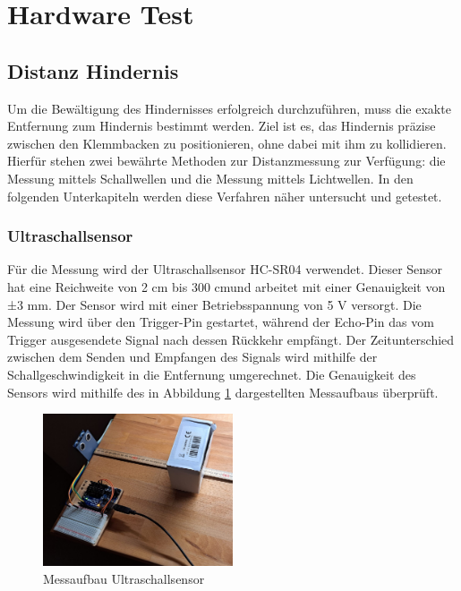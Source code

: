 \documentclass[../main.tex]{subfiles}
\begin{document}
\newpage
\section{Hardware Test}
\label{sec:Hardware_Test}
\subsection{Distanz Hindernis}
Um die Bewältigung des Hindernisses erfolgreich durchzuführen, muss die exakte Entfernung zum Hindernis bestimmt werden. Ziel ist es, das Hindernis präzise zwischen den Klemmbacken zu positionieren, ohne dabei mit ihm zu kollidieren. Hierfür stehen zwei bewährte Methoden zur Distanzmessung zur Verfügung: die Messung mittels Schallwellen und die Messung mittels Lichtwellen. In den folgenden Unterkapiteln werden diese Verfahren näher untersucht und getestet.

\subsubsection{Ultraschallsensor}
Für die Messung wird der Ultraschallsensor HC-SR04 verwendet. Dieser Sensor hat eine Reichweite von 2 cm bis 300 cm\footnotemark und arbeitet mit einer Genauigkeit von ±3 mm. Der Sensor wird mit einer Betriebsspannung von 5 V versorgt. Die Messung wird über den Trigger-Pin gestartet, während der Echo-Pin das vom Trigger ausgesendete Signal nach dessen Rückkehr empfängt. Der Zeitunterschied zwischen dem Senden und Empfangen des Signals wird mithilfe der Schallgeschwindigkeit in die Entfernung umgerechnet. Die Genauigkeit des Sensors wird mithilfe des in Abbildung \ref{fig:Ultraschall1} dargestellten Messaufbaus überprüft.

\begin{figure}[h] %
    \centering
    \includegraphics[width=0.5\textwidth]{img/sensortest/MA_Ultraschall.jpg} %
    \caption{Messaufbau Ultraschallsensor}
    \label{fig:Ultraschall1} %
\end{figure}
\end{document}
